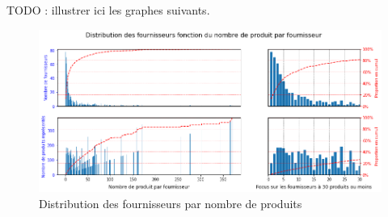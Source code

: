                 TODO : illustrer ici les graphes suivants.

                \begin{figure}[htbp]\CenterFloatBoxes
                    \begin{floatrow}
                    \end{floatrow}
                \end{figure}        

                \begin{figure}[htbp]
                    \begin{center}
                    \includegraphics[width=\linewidth]{img/distribution_fournisseurs_par_prd_count.png}
                    \end{center}
                    \caption{Distribution des fournisseurs par nombre de produits}
                    \label{fig:distrib_fourn_pdts}
                \end{figure}


